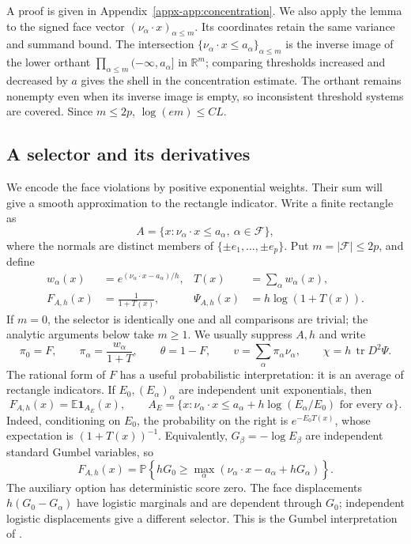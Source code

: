 \documentclass[11pt,letterpaper]{article}
\theoremstyle{remark}
\newcommand{\E}{\mathbb E}
\newcommand{\Pp}{\mathbb P}
\newcommand{\R}{\mathbb R}
\newcommand{\cF}{\mathcal F}
\newcommand{\tr}{\operatorname{tr}}
\newcommand{\ind}{\mathbf 1}
\begin{document}
A proof is given in Appendix~\ref{appx-app:concentration}.
We also apply the lemma to the signed face vector
\((\nu_\alpha\cdot x)_{\alpha\le m}\). Its coordinates retain
the same variance and summand bound. The intersection
\(\{\nu_\alpha\cdot x\le a_\alpha\}_{\alpha\le m}\) is the inverse
image of the lower orthant \(\prod_{\alpha\le m}(-\infty,a_\alpha]\)
in \(\R^m\); comparing thresholds increased and decreased by \(a\)
gives the shell in the concentration estimate. The orthant remains nonempty even when
its inverse image is empty, so inconsistent threshold systems are
covered. Since \(m\le2p\), \(\log(em)\le CL\).

\subsection{A selector and its derivatives}

We encode the face violations by positive exponential weights.  Their
sum will give a smooth approximation to the rectangle indicator.  Write
a finite rectangle as
\[
 A=\{x:\nu_\alpha\cdot x\le a_\alpha,\ \alpha\in\cF\},
\]
where the normals are distinct members of
\(\{\pm e_1,\ldots,\pm e_p\}\). Put \(m=|\cF|\le2p\), and define
\begin{equation}
 \begin{aligned}
 w_\alpha(x)&=e^{(\nu_\alpha\cdot x-a_\alpha)/h},
 &T(x)&=\sum_\alpha w_\alpha(x),\\
 F_{A,h}(x)&=\frac1{1+T(x)},
 &\Psi_{A,h}(x)&=h\log(1+T(x)).
 \end{aligned}
 \label{appx-eq:selector}
\end{equation}
If \(m=0\), the selector is identically one and all comparisons are
trivial; the analytic arguments below take \(m\ge1\).
We usually suppress \(A,h\) and write
\[
 \pi_0=F,\qquad \pi_\alpha=\frac{w_\alpha}{1+T},
 \qquad \theta=1-F,\qquad v=\sum_\alpha\pi_\alpha\nu_\alpha,
 \qquad \chi=h\,\tr D^2\Psi.
\]
The rational form of \(F\) has a useful probabilistic interpretation:
it is an average of rectangle indicators.  If
\(E_0,(E_\alpha)_\alpha\) are independent unit exponentials, then
\begin{equation}
 F_{A,h}(x)=\E\ind_{A_E}(x),\qquad
 A_E=\{x:\nu_\alpha\cdot x\le
 a_\alpha+h\log(E_\alpha/E_0)\text{ for every }\alpha\}.
 \label{appx-eq:exp-mixture}
\end{equation}
Indeed, conditioning on \(E_0\), the probability on the right is
\(e^{-E_0T(x)}\), whose expectation is \((1+T(x))^{-1}\).
Equivalently, \(G_\beta=-\log E_\beta\) are independent standard
Gumbel variables, so
\[
 F_{A,h}(x)=\Pp\!\left\{hG_0\ge
 \max_\alpha(\nu_\alpha\cdot x-a_\alpha+hG_\alpha)\right\}.
\]
The auxiliary option has deterministic score zero. The face displacements
\(h(G_0-G_\alpha)\) have logistic marginals and are dependent through
\(G_0\); independent logistic displacements give a different selector.
This is the Gumbel interpretation of \cite{Gumbel}.
\end{document}

